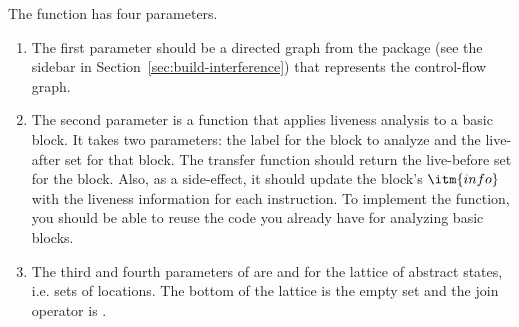 \documentclass[11pt]{book}
\begin{document}
The  function has four parameters.
\begin{enumerate}
\item The first parameter  should be a directed graph from the
   package (see the sidebar in
  Section~\ref{sec:build-interference}) that represents the
  control-flow graph.
\item The second parameter  is a function that applies
  liveness analysis to a basic block. It takes two parameters: the
  label for the block to analyze and the live-after set for that
  block.  The transfer function should return the live-before set for
  the block.  Also, as a side-effect, it should update the block's
  $\itm{info}$ with the liveness information for each instruction. To
  implement the  function, you should be able to reuse
  the code you already have for analyzing basic blocks.
\item The third and fourth parameters of  are
   and  for the lattice of abstract states,
  i.e.  sets of locations. The bottom of the lattice is the empty set
   and the join operator is .
\end{enumerate}
\end{document}
